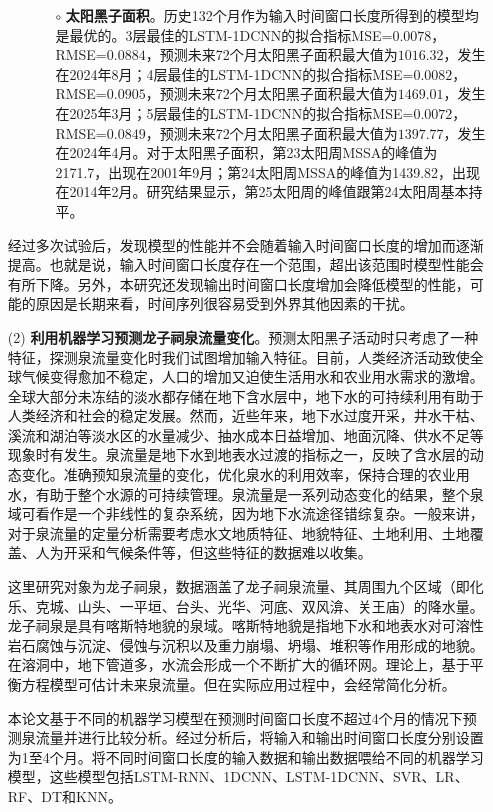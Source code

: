 \begin{enumerate}
\begin{itemize}
\begin{itemize}
      \item[$\circ$] \textbf{太阳黑子面积}。历史132个月作为输入时间窗口长度所得到的模型均是最优的。3层最佳的LSTM-1DCNN的拟合指标MSE=$0.0078$，RMSE=$0.0884$，预测未来72个月太阳黑子面积最大值为$1016.32$，发生在2024年8月；4层最佳的LSTM-1DCNN的拟合指标MSE=$0.0082$，RMSE=$0.0905$，预测未来72个月太阳黑子面积最大值为$1469.01$，发生在2025年3月；5层最佳的LSTM-1DCNN的拟合指标MSE=$0.0072$，RMSE=$0.0849$，预测未来72个月太阳黑子面积最大值为$1397.77$，发生在2024年4月。对于太阳黑子面积，第23太阳周MSSA的峰值为2171.7，出现在2001年9月；第24太阳周MSSA的峰值为1439.82，出现在2014年2月。研究结果显示，第25太阳周的峰值跟第24太阳周基本持平。 
    \end{itemize}
  \end{itemize}
  经过多次试验后，发现模型的性能并不会随着输入时间窗口长度的增加而逐渐提高。也就是说，输入时间窗口长度存在一个范围，超出该范围时模型性能会有所下降。另外，本研究还发现输出时间窗口长度增加会降低模型的性能，可能的原因是长期来看，时间序列很容易受到外界其他因素的干扰。

  \item[(2)] \textbf{利用机器学习预测龙子祠泉流量变化}。预测太阳黑子活动时只考虑了一种特征，探测泉流量变化时我们试图增加输入特征。目前，人类经济活动致使全球气候变得愈加不稳定，人口的增加又迫使生活用水和农业用水需求的激增。全球大部分未冻结的淡水都存储在地下含水层中，地下水的可持续利用有助于人类经济和社会的稳定发展。然而，近些年来，地下水过度开采，井水干枯、溪流和湖泊等淡水区的水量减少、抽水成本日益增加、地面沉降、供水不足等现象时有发生。泉流量是地下水到地表水过渡的指标之一，反映了含水层的动态变化。准确预知泉流量的变化，优化泉水的利用效率，保持合理的农业用水，有助于整个水源的可持续管理。泉流量是一系列动态变化的结果，整个泉域可看作是一个非线性的复杂系统，因为地下水流途径错综复杂。一般来讲，对于泉流量的定量分析需要考虑水文地质特征、地貌特征、土地利用、土地覆盖、人为开采和气候条件等，但这些特征的数据难以收集。
  
  这里研究对象为龙子祠泉，数据涵盖了龙子祠泉流量、其周围九个区域（即化乐、克城、山头、一平垣、台头、光华、河底、双风渰、关王庙）的降水量。龙子祠泉是具有喀斯特地貌的泉域。喀斯特地貌是指地下水和地表水对可溶性岩石腐蚀与沉淀、侵蚀与沉积以及重力崩塌、坍塌、堆积等作用形成的地貌。在溶洞中，地下管道多，水流会形成一个不断扩大的循环网。理论上，基于平衡方程模型可估计未来泉流量。但在实际应用过程中，会经常简化分析。
      
  本论文基于不同的机器学习模型在预测时间窗口长度不超过4个月的情况下预测泉流量并进行比较分析。经过分析后，将输入和输出时间窗口长度分别设置为1至4个月。将不同时间窗口长度的输入数据和输出数据喂给不同的机器学习模型，这些模型包括LSTM-RNN、1DCNN、LSTM-1DCNN、SVR、LR、RF、DT和KNN。
  

\end{enumerate}
